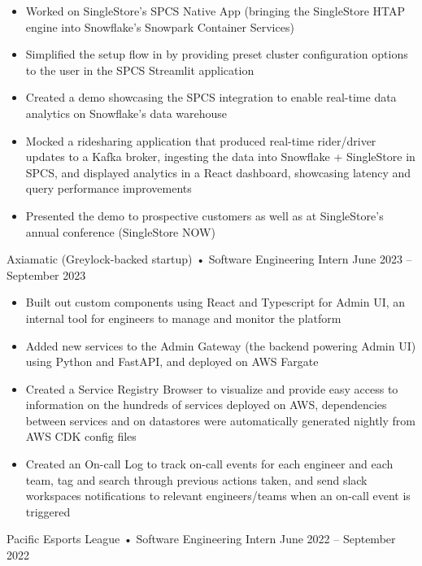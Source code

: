 \documentclass[9pt]{developercv} %
\begin{document}
\begin{entrylist}
{\begin{itemize}[noitemsep,topsep=0pt,parsep=0pt,partopsep=0pt, leftmargin=10pt]
            \item Worked on SingleStore's SPCS Native App (bringing the SingleStore HTAP engine into Snowflake's Snowpark Container Services)
            \item Simplified the setup flow in by providing preset cluster configuration options to the user in the SPCS Streamlit application
            \item Created a demo showcasing the SPCS integration to enable real-time data analytics on Snowflake's data warehouse
            \item Mocked a ridesharing application that produced real-time rider/driver updates to a Kafka broker, ingesting the data into Snowflake + SingleStore in SPCS, and displayed analytics in a React dashboard, showcasing latency and query performance improvements
            \item Presented the demo to prospective customers as well as at SingleStore's annual conference (SingleStore NOW)
        \end{itemize}}
    \entry
        {}
		{Axiamatic (Greylock-backed startup) • Software Engineering Intern}
		{June 2023 – September 2023}
		{\vspace{-8pt}
        \begin{itemize}[noitemsep,topsep=0pt,parsep=0pt,partopsep=0pt, leftmargin=10pt]
            \item Built out custom components using React and Typescript for Admin UI, an internal tool for engineers to manage and monitor the platform
            \item Added new services to the Admin Gateway (the backend powering Admin UI) using Python and FastAPI, and deployed on AWS Fargate
            \item Created a Service Registry Browser to visualize and provide easy access to information on the hundreds of services deployed on AWS, dependencies between services and on datastores were automatically generated nightly from AWS CDK config files
            \item Created an On-call Log to track on-call events for each engineer and each team, tag and search through previous actions taken, and send slack workspaces notifications to relevant engineers/teams when an on-call event is triggered
        \end{itemize}}
	\entry
		{}
		{Pacific Esports League • Software Engineering Intern}
		{June 2022 – September 2022}
		{\vspace{-8pt}
        \begin{itemize}[noitemsep,topsep=0pt,parsep=0pt,partopsep=0pt, leftmargin=10pt]

\end{itemize}}
\end{entrylist}
\end{document}
